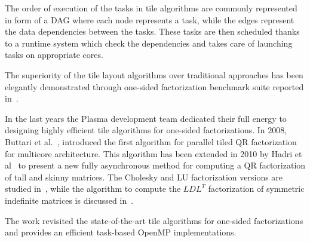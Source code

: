 The order of execution of the tasks in tile algorithms are commonly
represented in form of a DAG where each node represents a task, while
the edges represent the data dependencies between the tasks.  These
tasks are then scheduled thanks to a runtime system which check the
dependencies and takes care of launching tasks on appropriate cores.

The superiority of the tile layout algorithms over traditional
approaches has been elegantly demonstrated through one-sided
factorization benchmark suite reported in~\cite{agullo2009comparative}.


In the last years the Plasma development team dedicated their full
energy to designing highly efficient tile
algorithms for  one-sided factorizations. In 2008, Buttari et al.~\cite{buttari2008parallel},
introduced the first algorithm for parallel tiled QR factorization for
multicore architecture. This algorithm has been extended in 2010 by
Hadri et al~\cite{hadri2010tile} to present a new fully asynchronous
method for computing a QR factorization of tall and skinny matrices.
The Cholesky and LU factorization versions are studied
in~\cite{DBLP:journals/corr/abs-0709-1272}, while the algorithm to
compute the $LDL^T$ factorization of symmetric indefinite matrices is
discussed in~\cite{becker2011towards}.

The work revisited the state-of-the-art tile algorithms for  one-sided factorizations
 and provides an efficient task-based OpenMP implementations. 
